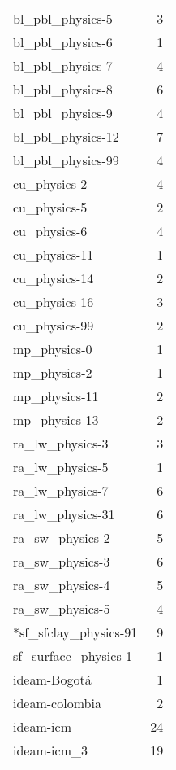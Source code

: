 \begin{itemize}
\begin{table}[H]
\begin{tabular}{lr}
bl\_pbl\_physics-5     &      3 \\
bl\_pbl\_physics-6     &      1 \\
bl\_pbl\_physics-7     &      4 \\
bl\_pbl\_physics-8     &      6 \\
bl\_pbl\_physics-9     &      4 \\
bl\_pbl\_physics-12    &      7 \\
bl\_pbl\_physics-99    &      4 \\ \hline
cu\_physics-2         &      4 \\
cu\_physics-5         &      2 \\
cu\_physics-6         &      4 \\
cu\_physics-11        &      1 \\
cu\_physics-14        &      2 \\
cu\_physics-16        &      3 \\
cu\_physics-99        &      2 \\ \hline
mp\_physics-0         &      1 \\
mp\_physics-2         &      1 \\
mp\_physics-11        &      2 \\
mp\_physics-13        &      2 \\ \hline
ra\_lw\_physics-3      &      3 \\
ra\_lw\_physics-5      &      1 \\
ra\_lw\_physics-7      &      6 \\
ra\_lw\_physics-31     &      6 \\ \hline
ra\_sw\_physics-2      &      5 \\
ra\_sw\_physics-3      &      6 \\
ra\_sw\_physics-4      &      5 \\
ra\_sw\_physics-5      &      4 \\ \hline
*sf\_sfclay\_physics-91 &      9 \\ \hline
sf\_surface\_physics-1 &      1 \\ \hline
ideam-Bogotá         &      1 \\
ideam-colombia       &      2 \\
ideam-icm            &     24 \\
ideam-icm\_3          &     19 \\


\bottomrule
\end{tabular}
\end{table}


\end{itemize}
